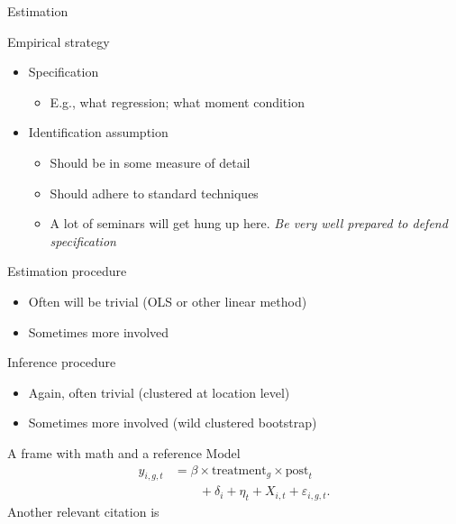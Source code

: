 \documentclass[aspectratio=169, 11pt]{beamer}
\begin{document}
\begin{frame}{Estimation}

    \small
    Empirical strategy\\
    \begin{itemize}
        \item Specification
        \begin{itemize}
            \item E.g., what regression; what moment condition
        \end{itemize}
        \item Identification assumption
        \begin{itemize}
            \item Should be in some measure of detail
            \item Should adhere to standard techniques
            \item A lot of seminars will get hung up here. \emph{Be very well prepared to defend specification}
        \end{itemize}
    \end{itemize}
    
    Estimation procedure\\
    \begin{itemize}
        \item Often will be trivial (OLS or other linear method)
        \item Sometimes more involved
    \end{itemize}
    
    Inference procedure\\
    \begin{itemize}
        \item Again, often trivial (clustered at location level)
        \item Sometimes more involved (wild clustered bootstrap)
    \end{itemize}
\end{frame}

\begin{frame}{A frame with math and a reference}
    Model \parencite{article1}
    \begin{equation}
    \begin{aligned}
        y_{i,g,t} &= \beta \times \text{treatment}_g \times \text{post}_t \\
        &\qquad + \delta_i + \eta_t + X_{i,t} + \varepsilon_{i,g,t}.
    \end{aligned}
    \end{equation}
    Another relevant citation is \textcite{article2}
\end{frame}
\end{document}
